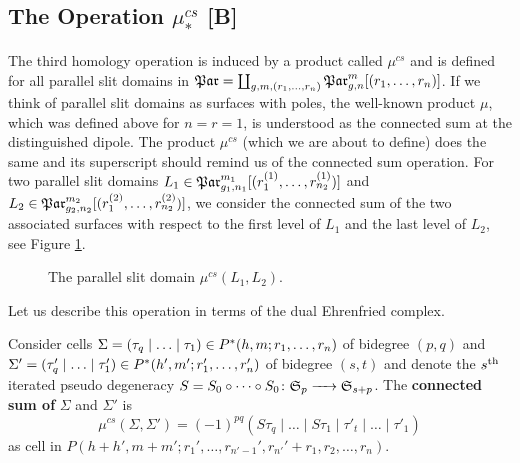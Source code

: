 \subsection{The Operation \texorpdfstring{$\mu^{cs}_\ast$}{muconnected_sum*} [B]}
\label{homology_operations:parallel_patching_slit_pics:construction_of_mu_cs}
The third homology operation is induced by a product called $\mu^{cs}$
\label{page:shorthand_par}%
and is defined for all parallel slit domains in $\Par = \coprod_{g,m,(r_1,\ldots, r_n)}\Parr$.
If we think of parallel slit domains as surfaces with poles, the well-known product $\mu$, which was defined above for $n=r=1$,
is understood as the connected sum at the distinguished dipole.
The product $\mu^{cs}$ (which we are about to define) does the same and its superscript should remind us of the connected sum operation.
For two parallel slit domains $L_1 \in \Par_{g_1,n_1}^{m_1}[(r^{(1)}_1, \ldots, r^{(1)}_{n_2})]$ and $L_2 \in \Par_{g_2,n_2}^{m_2}[(r^{(2)}_1, \ldots, r^{(2)}_{n_2})]$,
we consider the connected sum of the two associated surfaces with respect to the first level of $L_1$ and the last level of $L_2$, see Figure \ref{homology_operations:parallel_patching_slit_pics:mu_cs}.
\begin{figure}[ht]
    \centering
    \def\svgwidth{.3\columnwidth}
    
    \caption{\label{homology_operations:parallel_patching_slit_pics:mu_cs}The parallel slit domain $\mu^{cs}(L_1, L_2)$.}
\end{figure}

Let us describe this operation in terms of the dual Ehrenfried complex.
\begin{defi}
    \label{homology_operations:parallel_patching_slit_pics:connected_sum}
    Consider cells $\Sigma = \inhomq[\tau] \in P^\ast(h,m; r_1, \ldots, r_n)$ of bidegree $(p,q)$ and $\Sigma' = \inhomq[\tau'] \in P^\ast(h',m';r'_1, \ldots, r'_n)$ of bidegree $(s, t)$
    and denote the $s^{\text{th}}$ iterated pseudo degeneracy $S = S_0 \circ \cdots \circ S_0 \colon \mathfrak S_{p} \xrightarrow{\hspace{6pt}{}\hspace{6pt}} \mathfrak S_{s+p}$.
    The {\bf connected sum of} $\Sigma$ and $\Sigma'$ is
    \[
        \mu^{cs}(\Sigma, \Sigma') = (-1)^{pq} (S\tau_q \mid \ldots \mid S\tau_1 \mid \tau'_t \mid \ldots \mid \tau'_1)
    \]
    as cell in $P(h+h',m+m'; r_1', \ldots, r_{n'-1}', r_{n'}' + r_1, r_2, \ldots, r_n)$.
\end{defi}

